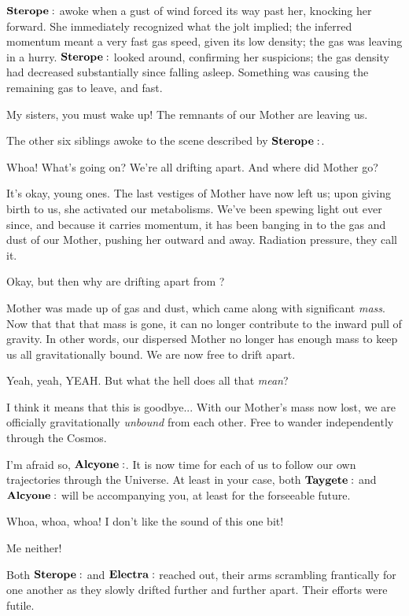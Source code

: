 $\Sterope$ awoke when a gust of wind forced its way past her, knocking her forward.  She immediately recognized what the jolt implied; the inferred momentum meant a very fast gas speed, given its low density; the gas was leaving in a hurry.  $\Sterope$ looked around, confirming her suspicions; the gas density had decreased substantially since falling asleep.  Something was causing the remaining gas to leave, and fast.

\Sterope My sisters, you must wake up!  The remnants of our Mother are leaving us.

The other six siblings awoke to the scene described by $\Sterope$.  

\Electra Whoa!  What's going on?  We're all drifting apart.  And where did Mother go?

\Maia It's okay, young ones.  The last vestiges of Mother have now left us; upon giving birth to us, she activated our metabolisms.  We've been spewing light out ever since, and because it carries momentum, it has been banging in to the gas and dust of our Mother, pushing her outward and away.  Radiation pressure, they call it.

\Electra Okay, but then why are  drifting apart from ?

\Maia Mother was made up of gas and dust, which came along with significant \textit{mass}.  Now that that that mass is gone, it can no longer contribute to the inward pull of gravity.  In other words, our dispersed  Mother no longer has enough mass to keep us all gravitationally bound.  We are now free to drift apart.  

\Taygete Yeah, yeah, YEAH.  But what the hell does all that \textit{mean}?

\Alcyone I think it means that this is goodbye...  With our Mother's mass now lost, we are officially gravitationally \textit{unbound} from each other.  Free to wander independently through the Cosmos.

\Maia I'm afraid so, $\Alcyone$.  It is now time for each of us to follow our own trajectories through the Universe.  At least in your case, both $\Taygete$ and $\Alcyone$ will be accompanying you, at least for the forseeable future.

\Electra Whoa, whoa, whoa!  I don't like the sound of this one bit!

\Sterope Me neither!

Both $\Sterope$ and $\Electra$ reached out, their arms scrambling frantically for one another as they slowly drifted further and further apart. Their efforts were futile.

